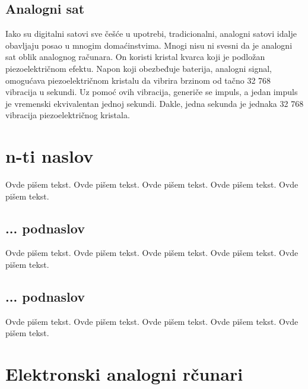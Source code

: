 \documentclass[a4paper]{article}
\begin{document}
{\subsection{Analogni sat}
\label{subsec:podnaslov6}


Iako su digitalni satovi sve češće u upotrebi, tradicionalni, analogni satovi idalje obavljaju posao u mnogim domaćinstvima. Mnogi nisu ni svesni da je analogni sat oblik analognog računara. On koristi kristal kvarca koji je podložan piezoelektričnom efektu. Napon koji obezbeđuje baterija, analogni signal, omogućava piezoelektričnom kristalu da vibrira brzinom od tačno 32 768 vibracija u sekundi. Uz pomoć ovih vibracija, generiče se impuls, a jedan impuls je vremenski ekvivalentan jednoj sekundi. Dakle, jedna sekunda je jednaka 32 768 vibracija piezoelektričnog kristala.


\section{n-ti naslov}
\label{sec:naslovN}

Ovde pišem tekst. 
Ovde pišem tekst. 
Ovde pišem tekst. 
Ovde pišem tekst. 
Ovde pišem tekst. 

\subsection{... podnaslov}
\label{subsec:podnaslovK}

Ovde pišem tekst. 
Ovde pišem tekst. 
Ovde pišem tekst. 
Ovde pišem tekst. 
Ovde pišem tekst. 

\subsection{... podnaslov}
\label{subsec:podnaslovM}

Ovde pišem tekst. 
Ovde pišem tekst. 
Ovde pišem tekst. 
Ovde pišem tekst. 
Ovde pišem tekst. 

\section{Elektronski analogni rčunari}
		\label{sec:naslov4}
		
}
\end{document}
